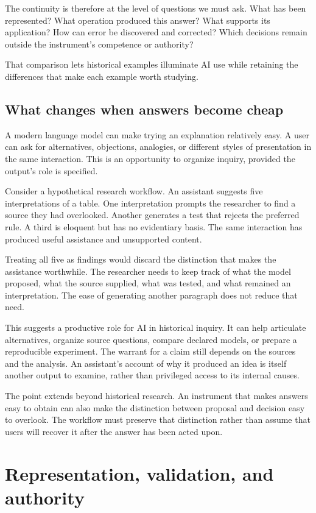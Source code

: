 \documentclass[11pt]{article}
\begin{document}
The continuity is therefore at the level of questions we must ask.
What has been represented? What operation produced this answer? What supports
its application? How can error be discovered and corrected? Which decisions
remain outside the instrument's competence or authority?

That comparison lets historical examples illuminate AI use while retaining
the differences that make each example worth studying.

\subsection{What changes when answers become cheap}

A modern language model can make trying an explanation relatively easy.
A user can ask for alternatives, objections, analogies, or different styles
of presentation in the same interaction. This is an opportunity to organize
inquiry, provided the output's role is specified.

Consider a hypothetical research workflow. An assistant suggests five
interpretations of a table. One interpretation prompts the researcher to
find a source they had overlooked. Another generates a test that rejects
the preferred rule. A third is eloquent but has no evidentiary basis.
The same interaction has produced useful assistance and unsupported content.

Treating all five as findings would discard the distinction that makes the
assistance worthwhile. The researcher needs to keep track of what the model
proposed, what the source supplied, what was tested, and what remained an
interpretation. The ease of generating another paragraph does not reduce
that need.

This suggests a productive role for AI in historical inquiry. It can help
articulate alternatives, organize source questions, compare declared models,
or prepare a reproducible experiment. The warrant for a claim still depends
on the sources and the analysis. An assistant's account of why it produced
an idea is itself another output to examine, rather than privileged access
to its internal causes.

The point extends beyond historical research. An instrument that makes
answers easy to obtain can also make the distinction between proposal and
decision easy to overlook. The workflow must preserve that distinction
rather than assume that users will recover it after the answer has been
acted upon.

\section{Representation, validation, and authority}
\end{document}
